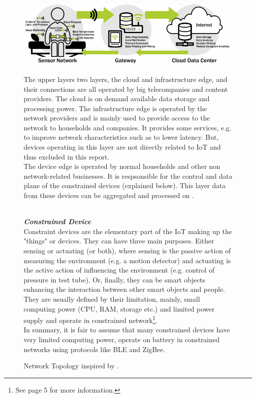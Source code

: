 \begin{figure}[h!]
    \centering
    \includegraphics[scale=1.8]{figures/iotSetup.png}
    \caption{Network Topology inspired by \cite{iotGatewaySlavesGraph}.}
    \label{fig:netowrkTopology}
The upper layers two layers, the cloud and infrastructure edge, and their connections are all operated by big telecompanies and content providers. The cloud is on demand available data storage and processing power. The infrastructure edge is operated by the network providers and is mainly used to provide access to the network to households and companies. It provides some services, e.g. to improve network characteristics such as to lower latency. But, devices operating in this layer are not directly related to IoT and thus excluded in this report.\\
The device edge is operated by normal households and other non network-related businesses. It is respsonsible for the control and data plane of the constrained devices (explained below). This layer data from these devices can be aggregated and processed on . 


\vspace{0.5mm}\\
\textbf{\textit{Constrained Device}}\\
Constraint devices are the elementary part of the IoT 
making up the "things" or devices\cite{contstraintDevicesTerminology}.
They can have three main purposes.
Either sensing or actuating (or both), where sensing is the 
passive action of measuring the environment (e.g. a motion detector) and actuating is the active action of influencing the environment (e.g. control of pressure in test tube). Or, finally, they can be smart objects enhancing the interaction between other smart objects and people.\\
They are usually defined by their limitation, mainly, small computing power (CPU, RAM, storage etc.) and limited power supply and operate in constrained network\footnote{See \cite{contstraintDevicesTerminology} page 5 for more information.}.\\
In summary, it is fair to assume that many constrained devices have very limited computing power, operate on battery in constrained networks using protocols like BLE and ZigBee. \\


\end{figure}

